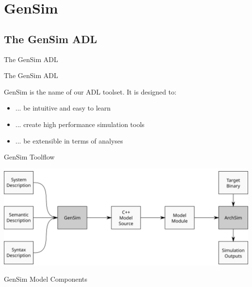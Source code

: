\section{GenSim}

\subsection{The GenSim ADL}

\begin{frame}{The GenSim ADL}

\end{frame}

\begin{frame}{The GenSim ADL}

GenSim is the name of our ADL toolset. It is designed to:

\begin{itemize}
	\item ... be intuitive and easy to learn
	\item ... create high performance simulation tools
	\item ... be extensible in terms of analyses

\end{itemize}

\end{frame}

\begin{frame}{GenSim Toolflow}

\centering
\includegraphics[width=\textwidth]{figures/gensim-toolflow}

\end{frame}

\begin{frame}{GenSim Model Components}

\end{frame}
